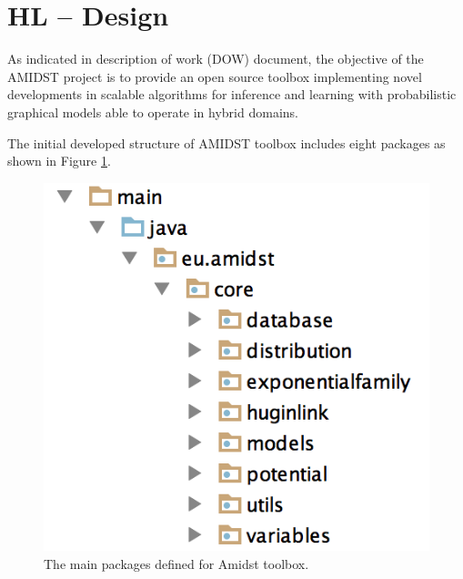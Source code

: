 \section{HL -- Design}\label{sec:design}



As indicated in description of work (DOW) document, the objective of the AMIDST project is to provide an open source toolbox implementing novel developments in scalable algorithms for inference and learning with probabilistic graphical models able to operate in hybrid domains. 

The initial developed structure of AMIDST toolbox includes eight packages as shown in Figure \ref{Figure:ToolboxStructure}.


\begin{figure}[ht!]
\begin{center}
\includegraphics[scale=0.85]{./figures/ToolboxStructure} 
\caption{\label{Figure:ToolboxStructure} The main packages defined for Amidst toolbox.}
\end{center}
\end{figure}